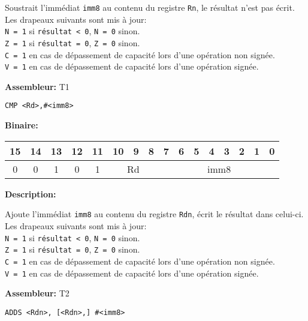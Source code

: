 \documentclass{article}
\begin{document}
    Soustrait l'immédiat \texttt{imm8} au contenu du registre \texttt{Rn}, le résultat n'est pas écrit.\\
    Les drapeaux suivants sont mis à jour:\\
    \texttt{N = 1} si \texttt{résultat < 0}, \texttt{N = 0} sinon.\\
    \texttt{Z = 1} si \texttt{résultat = 0}, \texttt{Z = 0} sinon.\\
    \texttt{C = 1} en cas de dépassement de capacité lors d'une opération non signée.\\
    \texttt{V = 1} en cas de dépassement de capacité lors d'une opération signée.

    \textbf{Assembleur:} T1

    \begin{lstlisting}
CMP <Rd>,#<imm8>
    \end{lstlisting}

    \textbf{Binaire:}

    \begin{tabular}{| c c c c c c c c c c c c c c c c |}
        \hline
        15 & 14 & 13 & \multicolumn{1}{|c}{12} & 11 & \multicolumn{1}{|c}{10} & 9 & 8 & \multicolumn{1}{|c}{7} & 6 & 5 & 4 & 3 & 2 & 1 & 0 \\
        \hline
        0 & 0 & 1 & \multicolumn{1}{|c}{0} & 1 & \multicolumn{3}{|c|}{Rd} & \multicolumn{8}{|c|}{imm8} \\
        \hline
    \end{tabular}


    \textbf{Description: }

    Ajoute l'immédiat \texttt{imm8} au contenu du registre \texttt{Rdn}, écrit le résultat dans celui-ci.\\
    Les drapeaux suivants sont mis à jour:\\
    \texttt{N = 1} si \texttt{résultat < 0}, \texttt{N = 0} sinon.\\
    \texttt{Z = 1} si \texttt{résultat = 0}, \texttt{Z = 0} sinon.\\
    \texttt{C = 1} en cas de dépassement de capacité lors d'une opération non signée.\\
    \texttt{V = 1} en cas de dépassement de capacité lors d'une opération signée.

    \textbf{Assembleur:} T2

    \begin{lstlisting}
ADDS <Rdn>, [<Rdn>,] #<imm8>
    \end{lstlisting}
\end{document}
